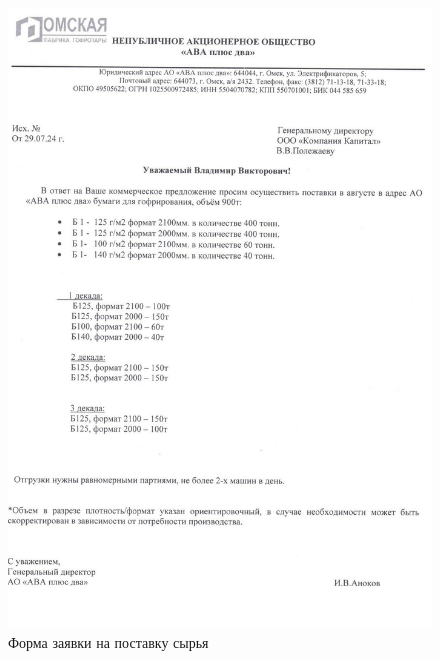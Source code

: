 \begin{figure}
\begin{center}
  \includegraphics[height=0.8\textheight, keepaspectratio]{Pics/d38.jpg}
\end{center}
  \caption{Форма заявки на поставку сырья}
  \label{pic:d38}
\end{figure}
\clearpage

